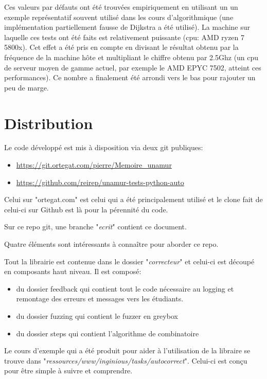 \documentclass[a4paper]{report}
\let\urlorig\url
\renewcommand{\url}[1]{%
   \begin{otherlanguage}{english}\urlorig{#1}\end{otherlanguage}%
}
\begin{document}
Ces valeurs par défauts ont été trouvées empiriquement en utilisant un un exemple représentatif souvent utilisé dans les cours d'algorithmique (une implémentation partiellement fausse de Dijkstra a été utilisé).
La machine sur laquelle ces tests ont été faits est relativement puissante (cpu: AMD ryzen 7 5800x).
Cet effet a été pris en compte en divisant le résultat obtenu par la fréquence de la machine hôte et multipliant le chiffre obtenu par 2.5Ghz (un cpu de serveur moyen de gamme actuel, par exemple le AMD EPYC 7502, atteint ces performances).
Ce nombre a finalement été arrondi vers le bas pour rajouter un peu de marge.

\section{Distribution}
Le code développé est mis à disposition via deux git publiques:
\begin{itemize}
\item \url{https://git.ortegat.com/pierre/Memoire_unamur}
\item \url{https://github.com/reirep/unamur-tests-python-auto}
\end{itemize}

Celui sur "ortegat.com" est celui qui a été principalement utilisé et le clone fait de celui-ci sur Github est là pour la pérennité du code.

Sur ce repo git, une branche "\textit{ecrit}" contient ce document.

Quatre éléments sont intéressants à connaître pour aborder ce repo.

Tout la librairie est contenue dans le dossier "\textit{correcteur}" et celui-ci est découpé en composants haut niveau.
Il est composé:
\begin{itemize}
\item du dossier feedback qui contient tout le code nécessaire au logging et remontage des erreurs et messages vers les étudiants.
\item du dossier fuzzing qui contient le fuzzer en greybox
\item du dossier steps qui contient l'algorithme de combinatoire
\end{itemize}

Le cours d'exemple qui a été produit pour aider à l'utilisation de la libraire se trouve dans "\textit{ressources/www/inginious/tasks/autocorrect}".
Celui-ci est conçu pour être simple à suivre et comprendre.
\end{document}
